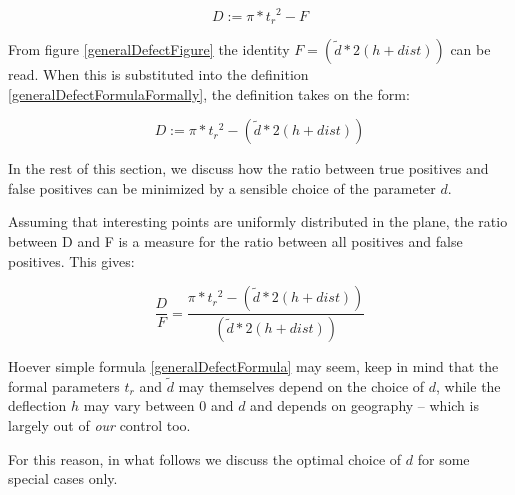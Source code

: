 \begin{equation}
\label{generalDefectFormulaFormally}
	D:=\pi*{t_r}^2-F
\end{equation}

From figure \ref{generalDefectFigure} the identity $F=(\tilde{d}*2(h+dist))$ can be read.
When this is substituted into the definition \ref{generalDefectFormulaFormally},
the definition takes on the form:

\begin{equation}
\label{generalDefectFormula}
        D:=\pi*{t_r}^2-(\tilde{d}*2(h+dist))
\end{equation}

In the rest of this section, we discuss how  the ratio between true positives and false positives 
can be minimized by a sensible choice of the parameter $d$. 

Assuming that interesting points are uniformly distributed in the plane, the
ratio between D and F is a measure for the ratio between all positives and false positives.
This gives:

\begin{equation}
\label{defectRatioFormula}
        \frac{D}{F}=\frac{\pi*{t_r}^2-(\tilde{d}*2(h+dist))}{(\tilde{d}*2(h+dist))}
\end{equation}


Hoever simple formula \ref{generalDefectFormula} may seem, keep in mind that the formal 
parameters $t_r$ and $\tilde{d}$ may themselves depend on the choice of $d$, while the 
deflection $h$ may vary between 0 and $d$ and depends on geography -- which  is largely out 
of \emph{our} control too.

For this reason, in what follows we discuss the optimal choice of $d$ for some 
special cases only.













